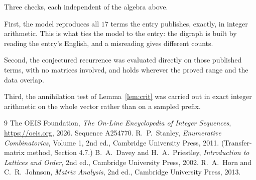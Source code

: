 \documentclass[11pt,a4paper]{article}
\theoremstyle{plain}
\theoremstyle{definition}
\begin{document}
Three checks, each independent of the algebra above.

First, the model reproduces all $17$ terms the entry publishes, exactly, in integer
arithmetic. This is what ties the model to the entry: the digraph is built by reading the
entry's English, and a misreading gives different counts.

Second, the conjectured recurrence was evaluated directly on those published terms, with no
matrices involved, and holds wherever the proved range and the data overlap.

Third, the annihilation test of Lemma~\ref{lem:crit} was carried out in exact integer
arithmetic on the whole vector rather than on a sampled prefix.

\begin{thebibliography}{9}
 The OEIS Foundation, \emph{The On-Line Encyclopedia of Integer
Sequences}, \url{https://oeis.org}, 2026. Sequence A254770.
 R.~P.~Stanley, \emph{Enumerative Combinatorics}, Volume 1, 2nd ed.,
Cambridge University Press, 2011. (Transfer-matrix method, Section 4.7.)
 B.~A.~Davey and H.~A.~Priestley, \emph{Introduction to Lattices and
Order}, 2nd ed., Cambridge University Press, 2002.
 R.~A.~Horn and C.~R.~Johnson, \emph{Matrix Analysis}, 2nd ed., Cambridge
University Press, 2013.
\end{thebibliography}
\end{document}
